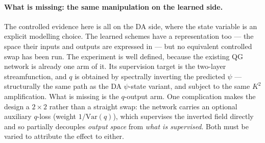 \paragraph{What is missing: the same manipulation on the learned side.}
The controlled evidence here is all on the DA side, where the state variable is
an explicit modelling choice. The learned schemes have a representation too ---
the space their inputs and outputs are expressed in --- but no equivalent
controlled swap has been run.
The experiment is well defined, because the existing QG network is already one
arm of it. Its supervision target is the two-layer streamfunction, and $q$ is
obtained by spectrally inverting the predicted $\psi$ --- structurally the same
path as the DA $\psi$-state variant, and subject to the same $K^2$
amplification. What is missing is the $q$-output arm. One complication makes the
design a $2\times 2$ rather than a straight swap: the network carries an optional
auxiliary $q$-loss (weight $1/\mathrm{Var}(q)$), which supervises the inverted
field directly and so partially decouples \emph{output space} from \emph{what is
supervised}. Both must be varied to attribute the effect to either.

